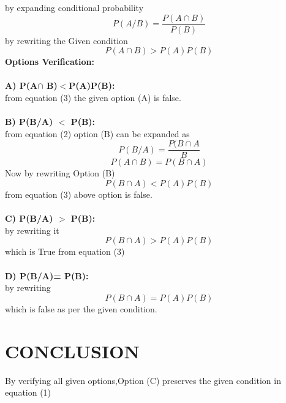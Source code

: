 \documentclass[journal,12pt,twocolumn]{IEEEtran}
\begin{document}
by expanding conditional probability
\begin{equation}
    P(A/B)=\frac{P(A\cap B)}{P(B)}
\end{equation}
by rewriting the Given condition
\begin{equation}
    P(A\cap B)>P(A)P(B)
\end{equation}
\textbf{Options Verification:}\\ \\
\textbf{
   A) P(A$\cap$ B)$<$P(A)P(B):
    }\\ 
from equation (3) the given option (A) is false.\\ \\
\textbf{B) P(B/A) $<$ P(B): }\\
from equation (2) option (B) can be expanded as
\begin{equation}
    P(B/A)=\frac{P(B\cap A}{B}
\end{equation}
\begin{equation}
    P(A\cap B)=P(B\cap A)
\end{equation}
Now by rewriting Option (B)\\
\begin{equation}
    P(B\cap A) < P(A)P(B)
\end{equation}
from equation (3) above option is false.\\ \\
\textbf{C) P(B/A) $>$ P(B): }\\
by rewriting it \\
\begin{equation}
    P(B\cap A)>P(A)P(B)
\end{equation}
which is True from equation (3)\\ \\
\textbf{D) P(B/A)= P(B): }\\
by rewriting \\
\begin{equation}
    P(B\cap A)=P(A)P(B)
\end{equation}
which is false as per the given condition.

\section{\textbf{CONCLUSION}}
By verifying all given options,Option (C) preserves the given condition in equation (1)
\end{document}
